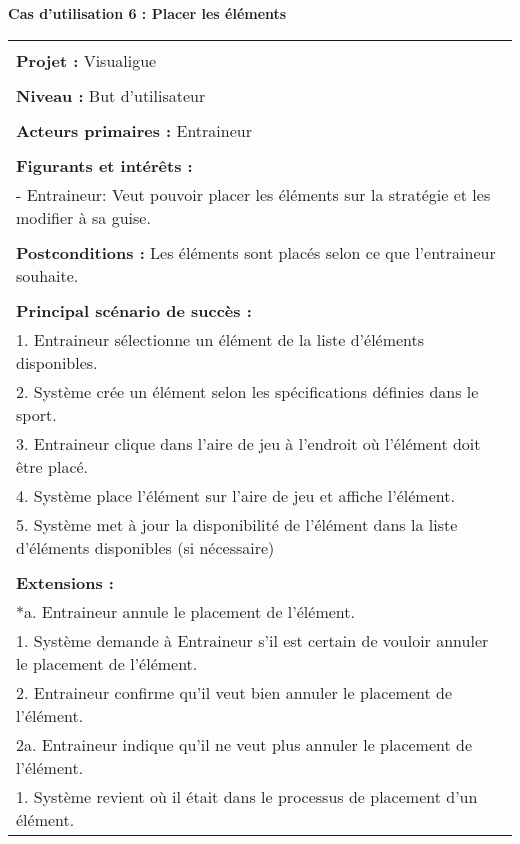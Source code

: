 \newpage
\begin{flushleft}
	\textbf{Cas d'utilisation 6 : Placer les éléments}\\
\end{flushleft}
\begin{tabular}{|p{16cm}|}
	\hline
	\\
	\textbf{Projet :} Visualigue\\
	\\
	\textbf{Niveau :} But d'utilisateur\\
	\\
	\textbf{Acteurs primaires :} Entraineur\\
	\\
	\textbf{Figurants et intérêts :} \\
	- Entraineur: Veut pouvoir placer les éléments sur la stratégie et les modifier à sa guise.\\
	\\
	\textbf{Postconditions :} Les éléments sont placés selon ce que l'entraineur souhaite.\\
	\\
	\textbf{Principal scénario de succès :}\\
	1. Entraineur sélectionne un élément de la liste d'éléments disponibles.\\
	2. Système crée un élément selon les spécifications définies dans le sport.\\
	3. Entraineur clique dans l'aire de jeu à l'endroit où l'élément doit être placé.\\
	4. Système place l'élément sur l'aire de jeu et affiche l'élément.\\
	5. Système met à jour la disponibilité de l'élément dans la liste d'éléments disponibles (si nécessaire)\\
	\\
	\textbf{Extensions :}\\
	*a. Entraineur annule le placement de l'élément.\\
	\hspace{0.5cm}1. Système demande à Entraineur s'il est certain de vouloir annuler le placement de l'élément.\\
	\hspace{0.5cm}2. Entraineur confirme qu'il veut bien annuler le placement de l'élément.\\
	\hspace{1cm}2a. Entraineur indique qu'il ne veut plus annuler le placement de l'élément.\\
	\hspace{1.5cm}1. Système revient où il était dans le processus de placement d'un élément.\\

\end{tabular}

